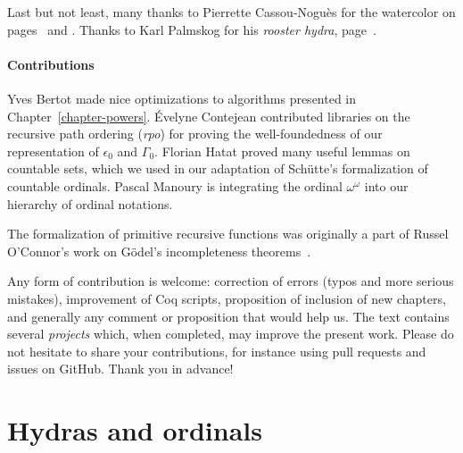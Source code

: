 \documentclass[twoside,a4paper]{book}
\begin{document}
Last but not least, many thanks to Pierrette Cassou-Noguès for the watercolor on pages~\pageref{watercolorgray} and
\pageref{watercolor}. Thanks to Karl Palmskog for his
\emph{rooster hydra}, page~\pageref{roosterhydra}.


\subsection{Contributions}

Yves Bertot made nice optimizations  to algorithms presented in Chapter~\ref{chapter-powers}.
\'Evelyne Contejean contributed libraries on the recursive path ordering (\emph{rpo}) for proving the well-foundedness of our representation of $\epsilon_0$ and $\Gamma_0$.
Florian Hatat proved many useful lemmas on countable sets, which we used in our adaptation of Schütte's formalization of countable ordinals. Pascal Manoury is integrating the ordinal $\omega^\omega$ into our hierarchy of ordinal notations.

The formalization of primitive recursive functions was originally a part of  Russel O'Connor's work on G\"odel's incompleteness theorems~\cite{OConnor05}. 

\label{sec:orgheadline2}

Any form of contribution  is welcome: correction of errors (typos and more serious mistakes), improvement of
Coq scripts, proposition of inclusion of new chapters, and generally any
comment or proposition that would help us. The text contains several \emph{projects} which, when completed, may improve the present work.
Please do not hesitate to share your contributions, for instance using pull requests and issues on GitHub. Thank you in advance!






\part{Hydras and ordinals}










\end{document}
